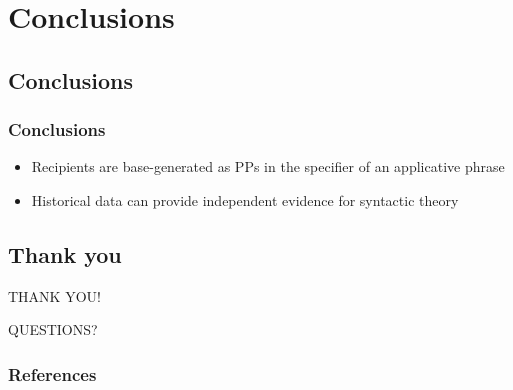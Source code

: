 \documentclass{beamer}
\begin{document}
\section{Conclusions}
\subsection{Conclusions}
\begin{frame}
	\frametitle{Conclusions}
	\begin{itemize}
		\item Recipients are base-generated as PPs in the specifier of an applicative phrase
		\item Historical data can provide independent evidence for syntactic theory
	\end{itemize}
\end{frame}
\subsection{Thank you}
\begin{frame}
\vfill
\begin{center}
THANK YOU!
\end{center}
\vfill
\end{frame}

\begin{frame}
\vfill
\begin{center}
	QUESTIONS?
\end{center}
\vfill
\end{frame}


\begin{frame}[allowframebreaks]
\frametitle{References}
\nocite{Haddican.2011,Haddican.2012,Gerwin.2013}

{}
\end{frame}
\end{document}

